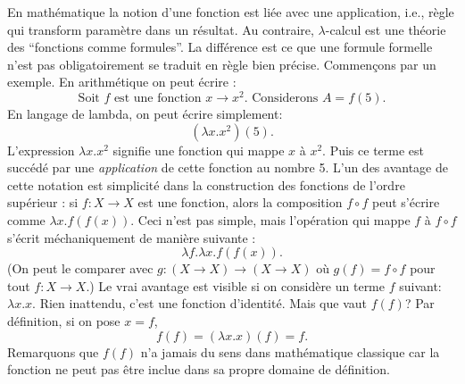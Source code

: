 En mathématique la notion d'une fonction est liée avec une application, i.e., règle qui transform paramètre dans un résultat.
Au contraire, $\lambda$-calcul est une théorie des ``fonctions comme formules''. La différence est ce que une formule formelle n'est pas obligatoirement se traduit en règle bien précise.
Commençons par un exemple.
En arithmétique on peut écrire : 
$$\text{Soit $f$ est une fonction $x \to x^2$. Considerons $A = f(5)$.}$$
En langage de lambda, on peut écrire simplement: $$(\lambda x.x^2) (5).$$
L'expression $\lambda x.x^2$ signifie une fonction qui mappe $x$ à $x^2$.
Puis ce terme est succédé par une \emph{application} de cette fonction au nombre 5.
L'un des avantage de cette notation est simplicité dans la construction des fonctions de l'ordre supérieur : si $f: X \to X$ est une fonction, alors la composition $f \circ f$ peut s'écrire comme $\lambda x.f(f(x))$.
Ceci n'est pas simple, mais l'opération qui mappe $f$ à $f \circ f$ s'écrit méchaniquement de manière suivante :
$$\lambda f. \lambda x.f(f(x)).$$
(On peut le comparer avec $g: (X \to X) \to (X \to X)$ où $g(f) = f \circ f$ pour tout $f: X \to X$.)
Le vrai avantage est visible si on considère un terme $f$ suivant: $\lambda x.x$.
Rien inattendu, c'est une fonction d'identité.
Mais que vaut $f(f)$?
Par définition, si on pose $x = f$,
$$f(f) = (\lambda x.x)(f) = f.$$
Remarquons que $f(f)$ n'a jamais du sens dans mathématique classique car la fonction ne peut pas être inclue dans sa propre domaine de définition.

